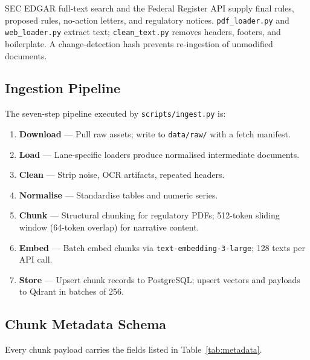 \documentclass[10pt,a4paper,twocolumn]{article}
\begin{document}
SEC EDGAR full-text search and the Federal Register API supply final rules, proposed rules,
no-action letters, and regulatory notices. \texttt{pdf\_loader.py} and \texttt{web\_loader.py}
extract text; \texttt{clean\_text.py} removes headers, footers, and boilerplate. A
change-detection hash prevents re-ingestion of unmodified documents.

\subsection{Ingestion Pipeline}

The seven-step pipeline executed by \texttt{scripts/ingest.py} is:

\begin{enumerate}[label=\textbf{S\arabic*.}]
  \item \textbf{Download} --- Pull raw assets; write to \texttt{data/raw/} with a fetch manifest.
  \item \textbf{Load} --- Lane-specific loaders produce normalised intermediate documents.
  \item \textbf{Clean} --- Strip noise, OCR artifacts, repeated headers.
  \item \textbf{Normalise} --- Standardise tables and numeric series.
  \item \textbf{Chunk} --- Structural chunking for regulatory PDFs; 512-token sliding window
        (64-token overlap) for narrative content.
  \item \textbf{Embed} --- Batch embed chunks via \texttt{text-embedding-3-large};
        128 texts per API call.
  \item \textbf{Store} --- Upsert chunk records to PostgreSQL; upsert vectors and payloads
        to Qdrant in batches of 256.
\end{enumerate}

\subsection{Chunk Metadata Schema}

Every chunk payload carries the fields listed in Table~\ref{tab:metadata}.
\end{document}
